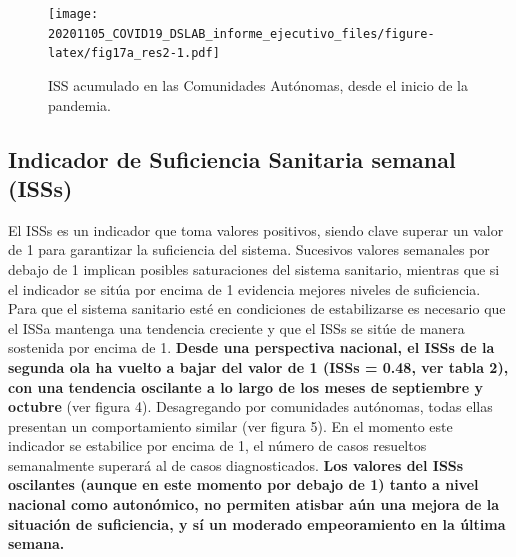 \documentclass[
  11pt,
]{article}
\begin{document}
\vspace{0.2cm}

\begin{figure}
\centering
\texttt{[image: 20201105\_COVID19\_DSLAB\_informe\_ejecutivo\_files/figure-latex/fig17a\_res2-1.pdf]}
\caption{\label{fig:fig17a_res} ISS acumulado en las Comunidades
Autónomas, desde el inicio de la pandemia.}
\end{figure}

\newpage

\hypertarget{indicador-de-suficiencia-sanitaria-semanal-isss}{%
\subsection{Indicador de Suficiencia Sanitaria semanal
(ISSs)}\label{indicador-de-suficiencia-sanitaria-semanal-isss}}

El ISSs es un indicador que toma valores positivos, siendo clave superar
un valor de 1 para garantizar la suficiencia del sistema. Sucesivos
valores semanales por debajo de 1 implican posibles saturaciones del
sistema sanitario, mientras que si el indicador se sitúa por encima de 1
evidencia mejores niveles de suficiencia. Para que el sistema sanitario
esté en condiciones de estabilizarse es necesario que el ISSa mantenga
una tendencia creciente y que el ISSs se sitúe de manera sostenida por
encima de 1. \textbf{Desde una perspectiva nacional, el ISSs de la
segunda ola ha vuelto a bajar del valor de 1 (ISSs = 0.48, ver tabla 2),
con una tendencia oscilante a lo largo de los meses de septiembre y
octubre} (ver figura 4). Desagregando por comunidades autónomas, todas
ellas presentan un comportamiento similar (ver figura 5). En el momento
este indicador se estabilice por encima de 1, el número de casos
resueltos semanalmente superará al de casos diagnosticados. \textbf{Los
valores del ISSs oscilantes (aunque en este momento por debajo de 1)
tanto a nivel nacional como autonómico, no permiten atisbar aún una
mejora de la situación de suficiencia, y sí un moderado empeoramiento en
la última semana.}
\end{document}
